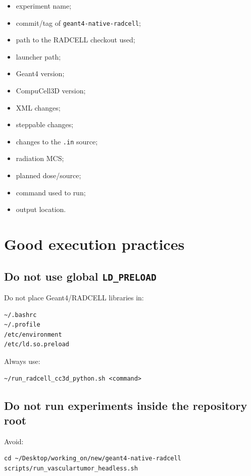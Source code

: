 \documentclass[11pt,a4paper,twoside,pdftex]{refrep}
\begin{document}
\begin{itemize}
  \item experiment name;
  \item commit/tag of \texttt{geant4-native-radcell};
  \item path to the RADCELL checkout used;
  \item launcher path;
  \item Geant4 version;
  \item CompuCell3D version;
  \item XML changes;
  \item steppable changes;
  \item changes to the \texttt{.in} source;
  \item radiation MCS;
  \item planned dose/source;
  \item command used to run;
  \item output location.
\end{itemize}

\chapter{Good execution practices}

\section{Do not use global \texttt{LD\_PRELOAD}}

Do not place Geant4/RADCELL libraries in:

\begin{lstlisting}
~/.bashrc
~/.profile
/etc/environment
/etc/ld.so.preload
\end{lstlisting}

Always use:

\begin{lstlisting}
~/run_radcell_cc3d_python.sh <command>
\end{lstlisting}

\section{Do not run experiments inside the repository root}

Avoid:

\begin{lstlisting}
cd ~/Desktop/working_on/new/geant4-native-radcell
scripts/run_vasculartumor_headless.sh
\end{lstlisting}
\end{document}
